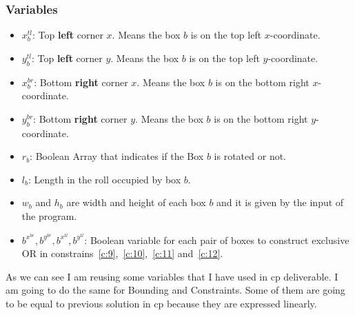 \documentclass[12pt, a4paper]{article}
\begin{document}
\subsubsection{Variables}
\begin{itemize}
  \item $x_b^{tl}$: Top \textbf{left} corner $x$. Means the box $b$ is on the top left $x$-coordinate.
  \item $y_b^{tl}$: Top \textbf{left} corner $y$. Means the box $b$ is on the top left $y$-coordinate.
  \item $x_b^{br}$: Bottom \textbf{right} corner $x$. Means the box $b$ is on the bottom right $x$-coordinate.
  \item $y_b^{br}$: Bottom \textbf{right} corner $y$. Means the box $b$ is on the bottom right $y$-coordinate.
  \item $r_b$: Boolean Array that indicates if the Box $b$ is rotated or not.
  \item $l_b$: Length in the roll occupied by box $b$.
  \item $w_b$ and $h_b$ are width and height of each box $b$ and it is given by the input of the program.
  \item $b^{x^{br}}, b^{y^{br}}, b^{x^{tl}}, b^{y^{tl}}$: Boolean variable for each pair of boxes to construct exclusive OR in constrains~\ref{c:9},~\ref{c:10},~\ref{c:11} and~\ref{c:12}.
\end{itemize}

As we can see I am reusing some variables that I have used in \acrfull{cp} deliverable. I am going to do the same for Bounding and Constraints. Some of them are going to be equal to previous solution in \acrshort{cp} because they are expressed linearly.
\end{document}
